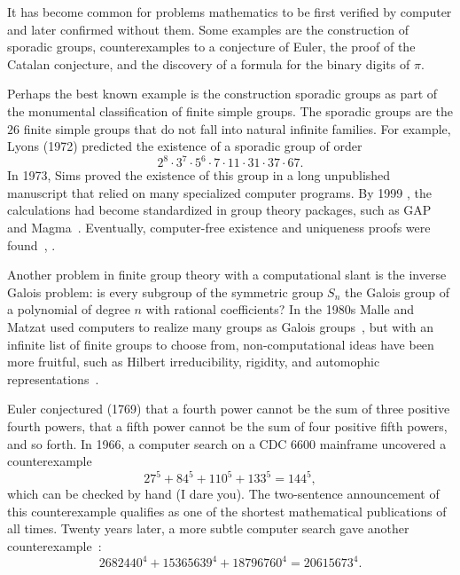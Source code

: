 \documentclass{llncs}
\begin{document}
It has become common for problems mathematics to be first verified by
computer and later confirmed without them.  Some examples are
the construction of sporadic groups, counterexamples to a conjecture
of Euler, the proof of the Catalan conjecture, and the discovery of a formula
for the binary digits of $\pi$.

Perhaps the best known example is the construction sporadic groups as
part of the monumental classification of finite simple groups.  The
sporadic groups are the $26$ finite simple groups that do not fall into
natural infinite families.  For example,  Lyons (1972) predicted
the existence of a sporadic group of order
\[
2^ 8\cdot 3^7\cdot 5^6\cdot  7\cdot 11 \cdot 31 \cdot 37 \cdot 67.
\]
In 1973, Sims proved the existence of this group in a long unpublished
manuscript that relied on many specialized computer programs.  By 1999
, the calculations had become standardized in group theory packages,
such as GAP and Magma~\cite{HS99}.  Eventually, computer-free
existence and uniqueness proofs were found~\cite{MParker},
\cite{AS92}.


Another problem in finite group theory with a computational slant is
the inverse Galois problem: is every subgroup of the symmetric group
$S_n$ the Galois group of a polynomial of degree $n$ with rational
coefficients?  In the 1980s Malle and Matzat used computers to realize
many groups as Galois groups~\cite{MM}, but with an infinite list of
finite groups to choose from, non-computational ideas have been more
fruitful, such as Hilbert irreducibility, rigidity, and automophic
representations~\cite{KLS}.

\smallskip

Euler conjectured (1769) that a fourth power cannot be the sum of
three positive fourth powers, that a fifth power cannot be the sum of
four positive fifth powers, and so forth.  In 1966, a computer search
\cite{LP66} on a CDC 6600 mainframe uncovered a counterexample
\[
27^5 + 84^5 + 110^5 + 133^5 = 144^5,
\]
which can be checked by hand (I dare you).  The two-sentence
announcement of this counterexample qualifies as one of the shortest
mathematical publications of all times.  Twenty years later, a more
subtle computer search gave another counterexample~\cite{Elkies88}:
\[
2682440^4 + 15365639^4 + 18796760^4 = 20615673^4.
\]
\end{document}
